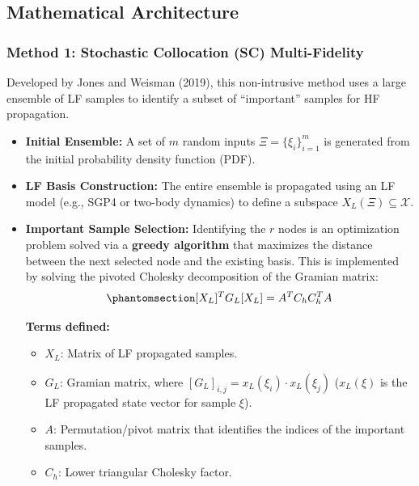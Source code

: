 \documentclass[
  letterpaper,
  DIV=11,
  numbers=noendperiod,
  oneside]{scrartcl}
\begin{document}
\subsection{Mathematical Architecture}\label{mathematical-architecture}

\subsubsection{Method 1: Stochastic Collocation (SC)
Multi-Fidelity}\label{sec-mf-sc}

Developed by Jones and Weisman (2019), this non-intrusive method uses a
large ensemble of LF samples to identify a subset of ``important''
samples for HF propagation.

\begin{itemize}
\item
  \textbf{Initial Ensemble:} A set of \(m\) random inputs
  \(\Xi = \{\xi_i\}_{i=1}^m\) is generated from the initial probability
  density function (PDF).
\item
  \textbf{LF Basis Construction:} The entire ensemble is propagated
  using an LF model (e.g., SGP4 or two-body dynamics) to define a
  subspace \(X_L(\Xi) \subseteq \mathcal{X}\).
\item
  \textbf{Important Sample Selection:} Identifying the \(r\) nodes is an
  optimization problem solved via a \textbf{greedy algorithm} that
  maximizes the distance between the next selected node and the existing
  basis. This is implemented by solving the pivoted Cholesky
  decomposition of the Gramian matrix:
  \begin{equation}\protect\phantomsection\label{eq-mf-pivoted-cholesky-decomp}{
  [X_L]^T G_L [X_L] = A^T C_h C_h^T A
  }\end{equation}

  \textbf{Terms defined:}

  \begin{itemize}
  \item
    \(X_L\): Matrix of LF propagated samples.
  \item
    \(G_L\): Gramian matrix, where
    \([G_L]_{i,j} = x_L(\xi_i) \cdot x_L(\xi_j)\) (\(x_L(\xi)\) is the
    LF propagated state vector for sample \(\xi\)).
  \item
    \(A\): Permutation/pivot matrix that identifies the indices of the
    important samples.
  \item
    \(C_h\): Lower triangular Cholesky factor.
  \end{itemize}


\end{itemize}
\end{document}
